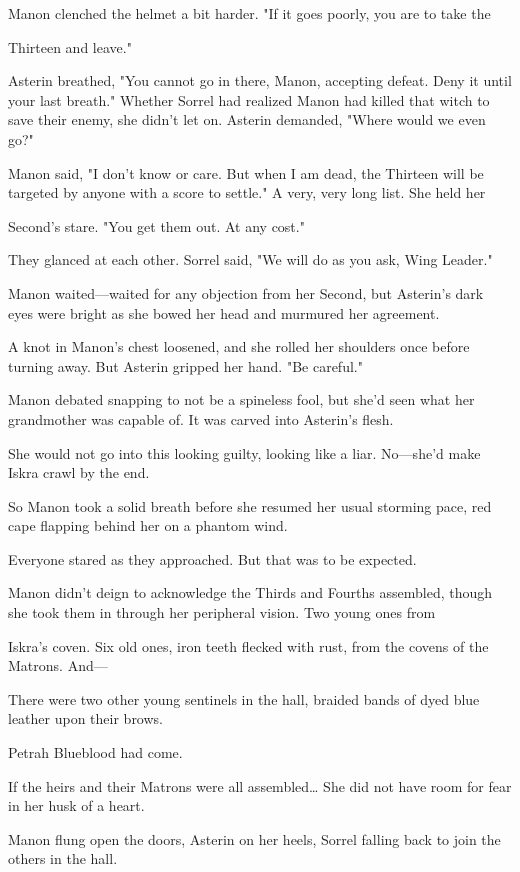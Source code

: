 Manon clenched the helmet a bit harder. "If it goes poorly, you are to take the

Thirteen and leave."

Asterin breathed, "You cannot go in there, Manon, accepting defeat. Deny it until your last breath." Whether Sorrel had realized Manon had killed that witch to save their enemy, she didn't let on. Asterin demanded, "Where would we even go?"

Manon said, "I don't know or care. But when I am dead, the Thirteen will be targeted by anyone with a score to settle." A very, very long list. She held her

Second's stare. "You get them out. At any cost."

They glanced at each other. Sorrel said, "We will do as you ask, Wing Leader."

Manon waited---waited for any objection from her Second, but Asterin's dark eyes were bright as she bowed her head and murmured her agreement.

A knot in Manon's chest loosened, and she rolled her shoulders once before turning away. But Asterin gripped her hand. "Be careful."

Manon debated snapping to not be a spineless fool, but  she'd seen what her grandmother was capable of. It was carved into Asterin's flesh.

She would not go into this looking guilty, looking like a liar. No---she'd make Iskra crawl by the end.

So Manon took a solid breath before she resumed her usual storming pace, red cape flapping behind her on a phantom wind.

Everyone stared as they approached. But that was to be expected.

Manon didn't deign to acknowledge the Thirds and Fourths assembled, though she took them in through her peripheral vision. Two young ones from

Iskra's coven. Six old ones, iron teeth flecked with rust, from the covens of the Matrons. And---

There were two other young sentinels in the hall, braided bands of dyed blue leather upon their brows.

Petrah Blueblood had come.

If the heirs and their Matrons were all assembled\ldots{} She did not have room for fear in her husk of a heart.

Manon flung open the doors, Asterin on her heels, Sorrel falling back to join the others in the hall.

